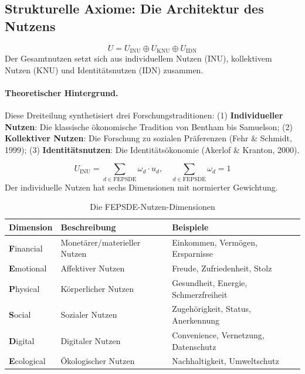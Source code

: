 \subsection{Strukturelle Axiome: Die Architektur des Nutzens}

\begin{axiom}
\begin{equation}
U = U_{\text{INU}} \oplus U_{\text{KNU}} \oplus U_{\text{IDN}}
\end{equation}
Der Gesamtnutzen setzt sich aus individuellem Nutzen (INU), kollektivem Nutzen (KNU) und Identitätsnutzen (IDN) zusammen.
\end{axiom}

\paragraph{Theoretischer Hintergrund.}
Diese Dreiteilung synthetisiert drei Forschungstraditionen: (1) \textbf{Individueller Nutzen}: Die klassische ökonomische Tradition von Bentham bis Samuelson; (2) \textbf{Kollektiver Nutzen}: Die Forschung zu sozialen Präferenzen (Fehr \& Schmidt, 1999); (3) \textbf{Identitätsnutzen}: Die Identitätsökonomie (Akerlof \& Kranton, 2000).

\begin{axiom}
\begin{equation}
U_{\text{INU}} = \sum_{d \in \text{FEPSDE}} \omega_d \cdot u_d, \quad \sum_{d \in \text{FEPSDE}} \omega_d = 1
\end{equation}
Der individuelle Nutzen hat sechs Dimensionen mit normierter Gewichtung.
\end{axiom}

\begin{table}[h]
\centering
\caption{Die FEPSDE-Nutzen-Dimensionen}
\begin{tabular}{@{}lp{5cm}p{5cm}@{}}
\toprule
\textbf{Dimension} & \textbf{Beschreibung} & \textbf{Beispiele} \\
\midrule
\textbf{F}inancial & Monetärer/materieller Nutzen & Einkommen, Vermögen, Ersparnisse \\
\textbf{E}motional & Affektiver Nutzen & Freude, Zufriedenheit, Stolz \\
\textbf{P}hysical & Körperlicher Nutzen & Gesundheit, Energie, Schmerzfreiheit \\
\textbf{S}ocial & Sozialer Nutzen & Zugehörigkeit, Status, Anerkennung \\
\textbf{D}igital & Digitaler Nutzen & Convenience, Vernetzung, Datenschutz \\
\textbf{E}cological & Ökologischer Nutzen & Nachhaltigkeit, Umweltschutz \\
\bottomrule
\end{tabular}
\end{table}

